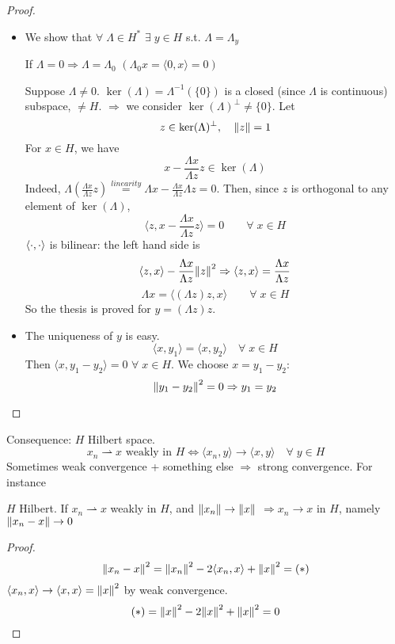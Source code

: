 \begin{proof}
    \begin{itemize}
        \item We show that \(\forall\; \Lambda \in H^* \) \(\exists\; y \in H\) s.t. \(\Lambda = \Lambda_y\)
        
        If \(\Lambda = 0 \Rightarrow \Lambda = \Lambda_0\) \((\Lambda_0 x = \langle 0, x\rangle   = 0)\)

        Suppose \(\Lambda \neq 0. \) \(\ker(\Lambda) = \Lambda^{-1}(\{0\}) \) is a closed (since \(\Lambda\) is continuous) subspace, \(\neq H\). \(\Rightarrow\) we consider \(\ker(\Lambda)^\perp \neq \{0\}\). Let
        \[
            z \in \ker(\Lambda)^\perp, \quad \norm{z}=1
        \]
        For \(x \in H\), we have
        \[
            x - \frac{\Lambda x}{\Lambda z} z \in \ker(\Lambda)
        \]
        Indeed, \(\Lambda \left( \frac{\Lambda x}{\Lambda z} z \right) \overset{linearity}{=} \Lambda x - \frac{\Lambda x}{\Lambda z} \Lambda z = 0\). Then, since \(z\) is orthogonal to any element of \(\ker(\Lambda)\), 
        \[
            \langle z, x - \frac{\Lambda x}{\Lambda z} z\rangle   = 0 \qquad \forall\; x \in H
        \] 
        \(\langle \cdot,\cdot \rangle  \) is bilinear: the left hand side is 
        \[
            \langle z, x\rangle   - \frac{\Lambda x}{\Lambda z} \norm{z}^2 \Rightarrow \langle z, x\rangle   = \frac{\Lambda x}{\Lambda z} 
        \]
        \[
            \Lambda x = \langle (\Lambda z)z, x\rangle   \qquad \forall \; x \in H
        \]
        So the thesis is proved for \(y = (\Lambda z)z\).

        \item The uniqueness of \(y\) is easy.
        \[
            \langle x, y_1\rangle   = \langle x, y_2\rangle   \quad \forall \; x \in H
        \]
        Then \(\langle x, y_1-y_2\rangle   = 0\) \(\forall \; x \in H\). We choose \(x = y_1 -y_2\):
        \[
            \norm{y_1 - y_2}^2 = 0 \Rightarrow y_1 = y_2
        \]
    \end{itemize}
\end{proof}

Consequence: \(H\) Hilbert space.
\[
    x_n \rightharpoonup x \text{ weakly in } H \Leftrightarrow \langle x_n, y\rangle   \to \langle x, y\rangle   \quad \forall\; y \in H
\]
Sometimes weak convergence + something else \(\Rightarrow\) strong convergence. For instance
\begin{proposition}
    \(H\) Hilbert. If \(x_n \rightharpoonup x\) weakly in \(H\), and \(\norm{x_n} \to \norm{x}\) \(\Rightarrow x_n \to x\) in \(H\), namely \(\norm{x_n - x} \to 0\)
\end{proposition}
\begin{proof}
    \[
        \norm{x_n - x }^2 = \norm{x_n}^2 - 2 \langle x_n, x\rangle   + \norm{x}^2 = (*)
    \]
    \(\langle x_n, x\rangle   \to \langle x, x\rangle   = \norm{x}^2 \) by weak convergence.
    \[
        (*) = \norm{x}^2 - 2 \norm{x}^2 + \norm{x}^2 = 0
    \]
\end{proof}


